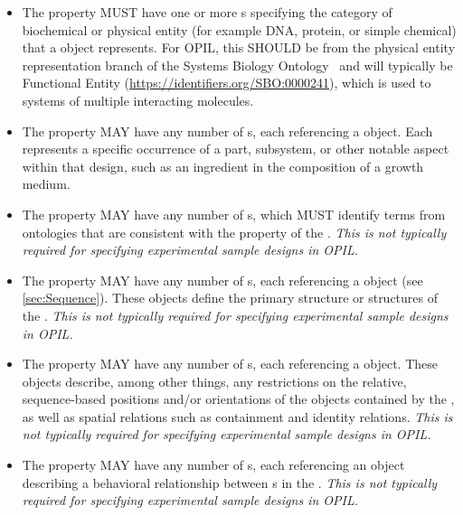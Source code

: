 \begin{itemize}
\item \label{sec:sbol:type:C}
The  property MUST have one or more s specifying the category of biochemical or physical entity (for example DNA, protein, or simple chemical) that a  object represents.
For OPIL, this SHOULD be from the physical entity representation branch of the Systems Biology Ontology~\citep{SBO}
and will typically be Functional Entity (\url{https://identifiers.org/SBO:0000241}), which is used to systems of multiple interacting molecules.

\item \label{sec:sbol:hasFeature}
The  property MAY have any number of s, each referencing a  object. Each  represents a specific occurrence of a part, subsystem, or other notable aspect within that design, such as an ingredient in the composition of a growth medium.

\item \label{sec:sbol:role:C}
The  property MAY have any number of s, which MUST identify terms from ontologies that are consistent with the  property of the .  
{\em This is not typically required for specifying experimental sample designs in OPIL.}

\item \label{sec:sbol:hasSequence:C}
The  property MAY have any number of s, each referencing a  object (see \ref{sec:Sequence}).  These objects define the primary structure or structures of the .
{\em This is not typically required for specifying experimental sample designs in OPIL.}

\item \label{sec:sbol:hasConstraint}
The  property MAY have any number of s, each referencing a  object.
These objects describe, among other things, any restrictions on the relative, sequence-based positions and/or orientations of the  objects contained by the , as well as spatial relations such as containment and identity relations.
{\em This is not typically required for specifying experimental sample designs in OPIL.}

\item \label{sec:sbol:hasInteraction}
The  property MAY have any number of s, each referencing an  object describing a behavioral relationship between s in the .
{\em This is not typically required for specifying experimental sample designs in OPIL.}


\end{itemize}
